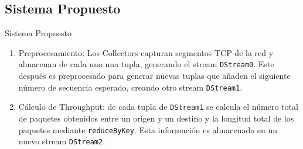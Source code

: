\documentclass[aspectratio=149]{beamer}
\begin{document}
\subsection{Sistema Propuesto}
\begin{frame}[label=sistema]{Sistema Propuesto}
    \begin{enumerate}
        \item Preprocesamiento: Los Collectors capturan segmentos TCP de la red y almacenan de cada uno una tupla, generando el stream \texttt{DStream0}. Este después es preprocesado para generar nuevas tuplas que añaden el siguiente número de secuencia esperado, creando otro stream \texttt{DStream1}.
        \item Cálculo de Throughput: de cada tupla de \texttt{DStream1} se calcula el número total de paquetes obtenidos entre un origen y un destino y la longitud total de los paquetes mediante \texttt{reduceByKey}. Esta información es almacenada en un nuevo stream \texttt{DStream2}.
    \end{enumerate}
\end{frame}
\end{document}
